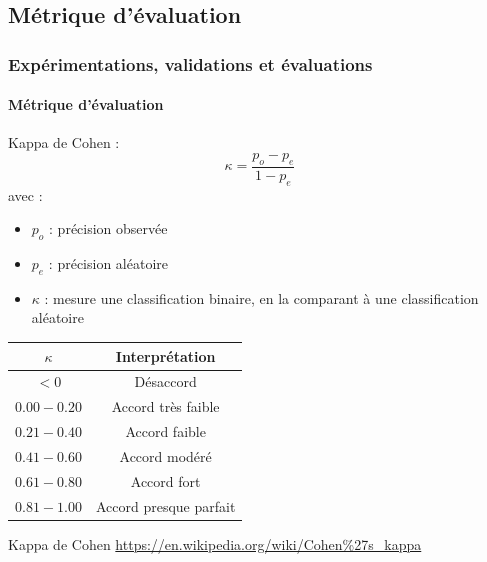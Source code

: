 \documentclass{beamer}
\begin{document}
		\subsection{Métrique d'évaluation}
			\begin{frame}
				\frametitle{Expérimentations, validations et évaluations}
				\framesubtitle{Métrique d'évaluation}
				\small
				\vspace{-5pt}
				Kappa de Cohen :
				\vspace{-5pt}
				\begin{equation*}
					\kappa = \frac{p_o - p_e}{1 - p_e}
				\end{equation*}
				\vspace{-5pt}
				avec :
				\begin{itemize}
					\item $p_o$ : précision observée
					\item $p_e$ : précision aléatoire
					\item $\kappa$ : mesure une classification binaire, en la comparant à une classification aléatoire
				\end{itemize}
				\vspace{-15pt}
				\begin{table}
					\centering
					\begin{tabular}{|c|c|}
						\hline
						$\kappa$ & Interprétation \\
						\hline
						$< 0$ & Désaccord \\
						\hline
						$0.00 - 0.20$ & Accord très faible \\
						\hline
						$0.21 - 0.40$ & Accord faible \\
						\hline
						$0.41 - 0.60$ & Accord modéré \\
						\hline
						$0.61 - 0.80$ & Accord fort \\
						\hline
						$0.81 - 1.00$ & Accord presque parfait \\
						\hline
					\end{tabular}
				\end{table}
				Kappa de Cohen \url{https://en.wikipedia.org/wiki/Cohen\%27s_kappa}
			\end{frame}
\end{document}
